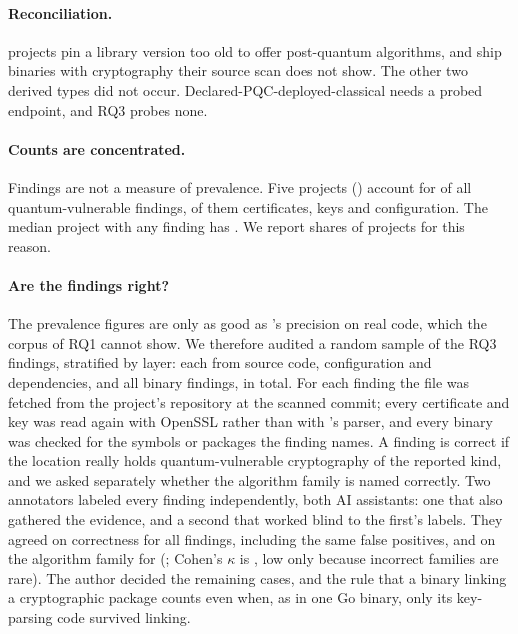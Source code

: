 \paragraph{Reconciliation.}  projects pin a
library version too old to offer post-quantum algorithms, and
 ship binaries with cryptography their source
scan does not show. The other two derived types did not occur.
Declared-PQC-deployed-classical needs a probed endpoint, and RQ3 probes none.

\paragraph{Counts are concentrated.} Findings are not a measure of
prevalence. Five projects () account for
 of all quantum-vulnerable findings,
 of them certificates, keys and
configuration. The median
project with any finding has . We report
shares of projects for this reason.

\paragraph{Are the findings right?} The prevalence figures are only as good as
\tool{}'s precision on real code, which the corpus of RQ1 cannot show. We
therefore audited a random sample of the RQ3 findings, stratified by layer:
 each from source code, configuration and
dependencies, and all  binary findings,
 in total. For each finding the
file was fetched from the project's repository at the scanned commit; every
certificate and key was read again with OpenSSL rather than with \tool{}'s
parser, and every binary was checked for the symbols or packages the finding
names. A finding is correct if the location really holds quantum-vulnerable
cryptography of the reported kind, and we asked separately whether the
algorithm family is named correctly. Two annotators labeled every finding
independently, both AI assistants: one that also gathered the evidence, and a
second that worked blind to the first's labels. They agreed on correctness for
all  findings, including the same
 false positives, and on the algorithm family for
 (; Cohen's
$\kappa$ is , low only because incorrect families
are rare). The author decided the  remaining
cases, and the rule that a binary linking a cryptographic package counts even
when, as in one Go binary, only its key-parsing code survived linking.

